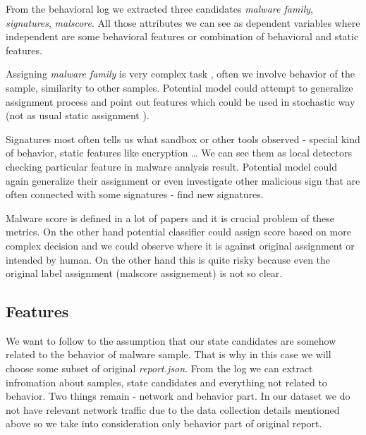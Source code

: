 From the behavioral log we extracted three candidates \emph{malware family}, \emph{signatures}, \emph{malscore}. All those attributes we can see as dependent variables where independent are some behavioral features or combination of behavioral and static features. 

Assigning \emph{malware family} is very complex task , often we involve behavior of the sample, similarity to other samples. Potential model could attempt to generalize  assignment process and point out features which could be used in stochastic way (not as usual static assignment ). 

Signatures most often tells us what sandbox or other tools observed - special kind of behavior, static features like encryption \dots {} We can see them as local detectors checking particular feature in malware analysis result. Potential model could again generalize their assignment or even investigate other malicious sign that are often connected with some signatures - find new signatures.


Malware score is defined in a lot of papers  and it is crucial problem of these metrics. On the other hand potential classifier could assign score based on more complex decision and we could observe where it is against original assignment or intended by human. On the other hand this is quite risky because even the original label assignment (malscore assignement) is not so clear.


\subsection{Features}
We want to follow to the assumption that our state candidates are somehow related to the behavior of malware sample. That is why in this case we will choose some subset of original \emph{report.json}.
From the log we can extract infromation about samples, state candidates and everything not related to behavior. Two things remain - network and behavior part. In our dataset we do not have relevant network traffic due to the data collection details mentioned above so we take into consideration only behavior part of original report.

